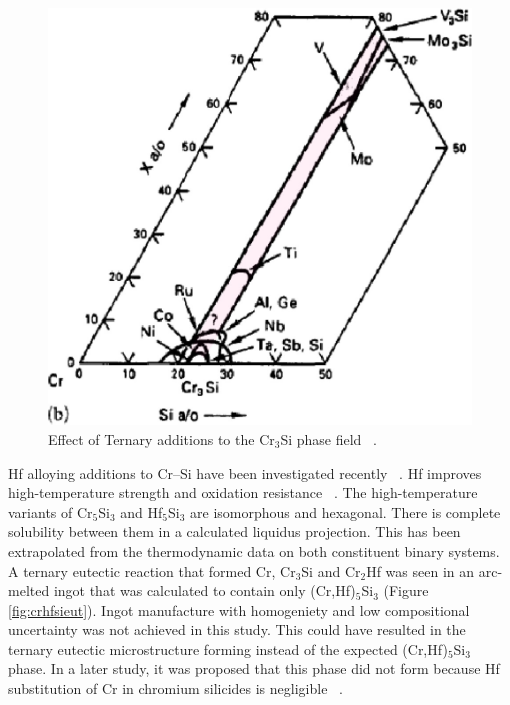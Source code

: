 %
\begin{figure}[H]
\begin{center}
\includegraphics{Cr3Si_alloying}
\caption{Effect of Ternary additions to the Cr$_3$Si phase field ~\cite{shah92}.}\label{fig:Cr3Si_alloying}
\end{center}
\end{figure}
\vspace{-5mm}
%

\clearpage
Hf alloying additions to Cr--Si have been investigated recently ~\cite{schoonover08}.  Hf improves high-temperature strength and  oxidation resistance ~\cite{yang09}.  The high-temperature variants of Cr$_5$Si$_3$ and Hf$_5$Si$_3$ are isomorphous and hexagonal.  There is complete solubility between them in a calculated liquidus projection.  This has been extrapolated from the thermodynamic data on both constituent binary systems.  A ternary eutectic reaction that formed Cr, Cr$_3$Si and Cr$_2$Hf was seen in an arc-melted ingot that was calculated to contain only (Cr,Hf)$_5$Si$_3$ (Figure \ref{fig:crhfsieut}).  Ingot manufacture with homogeniety and low compositional uncertainty was not achieved in this study.  This could have resulted in the ternary eutectic microstructure forming instead of the expected (Cr,Hf)$_5$Si$_3$ phase.  In a later study, it was proposed that this phase did not form because Hf substitution of Cr in chromium silicides is negligible ~\cite{yang09}.
 
